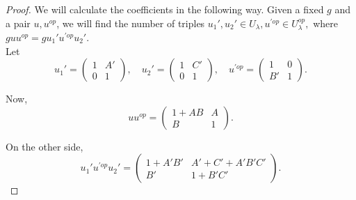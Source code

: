 \documentclass[12pt,reqno]{amsart}
\theoremstyle{definition}
\theoremstyle{remark}
\numberwithin{equation}{section}
\begin{document}
\begin{proof} We will calculate the coefficients in the following way. Given a fixed $g$ and a pair $u, u^{op}$, we will find the number of triples $u_1', u_2'\in U_{\lambda}, u^{\prime op}\in U_{\lambda}^{op}, $ where $gu u^{op} = g u_1' u^{\prime op} u_2'$.\\


Let
\[
    u_1'=\begin{pmatrix}
1 & A' \\
0 & 1 
\end{pmatrix},\quad u_2' = \begin{pmatrix}
1 & C' \\
0 & 1 
\end{pmatrix},\quad 
u^{\prime op}=\begin{pmatrix}
1 & 0 \\
B' & 1 
\end{pmatrix}.
\]

Now,
\begin{equation}\label{u_uop}
    u u^{op} = \begin{pmatrix}
1+AB & A \\
B & 1
\end{pmatrix}.
\end{equation}

On the other side,
\[
    u_1' u^{\prime op} u_2' = \begin{pmatrix}
1+A'B' & A'+C'+A'B'C' \\
B' & 1+B'C'
\end{pmatrix}.
\]


\end{proof}
\end{document}

